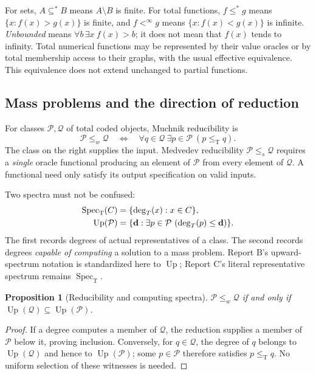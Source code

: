 \documentclass[11pt,a4paper]{article}
\newcommand{\leT}{\leq_{\mathrm T}}
\newcommand{\substar}{\subseteq^{*}}\newcommand{\lestar}{\leq^{*}}
\newcommand{\Spec}{\operatorname{Spec}_{\mathrm T}}\newcommand{\Up}{\operatorname{Up}}
\newtheorem{proposition}[theorem]{Proposition}
\theoremstyle{definition}\newtheorem{definition}[theorem]{Definition}
\theoremstyle{remark}\newtheorem{remark}[theorem]{Remark}
\begin{document}
For sets, $A\substar B$ means $A\setminus B$ is finite. For total functions, $f\lestar g$ means $\{x:f(x)>g(x)\}$ is finite, and $f<^\infty g$ means $\{x:f(x)<g(x)\}$ is infinite. \emph{Unbounded} means $\forall b\,\exists x\ f(x)>b$; it does not mean that $f(x)$ tends to infinity. Total numerical functions may be represented by their value oracles or by total membership access to their graphs, with the usual effective equivalence. This equivalence does not extend unchanged to partial functions.

\subsection{Mass problems and the direction of reduction}
For classes $\mathcal P,\mathcal Q$ of total coded objects, Muchnik reducibility is
\[
 \mathcal P\leq_w\mathcal Q
 \quad\Longleftrightarrow\quad
 \forall q\in\mathcal Q\ \exists p\in\mathcal P\ (p\leT q).
\]
The class on the right supplies the input. Medvedev reducibility $\mathcal P\leq_s\mathcal Q$ requires a \emph{single} oracle functional producing an element of $\mathcal P$ from every element of $\mathcal Q$. A functional need only satisfy its output specification on valid inputs.\cite{LMNS,McDonald}

Two spectra must not be confused:
\begin{align}
 \Spec(C)&=\{\deg_T(x):x\in C\},\notag\\
 \Up(\mathcal P)&=\{\mathbf d:\exists p\in\mathcal P\ (\deg_T(p)\leq\mathbf d)\}.
 \label{eq:spectrum}
\end{align}
The first records degrees of actual representatives of a class. The second records degrees \emph{capable of computing} a solution to a mass problem. Report B's upward-spectrum notation is standardized here to $\Up$; Report C's literal representative spectrum remains $\Spec$.

\begin{proposition}[Reducibility and computing spectra]
$\mathcal P\leq_w\mathcal Q$ if and only if $\Up(\mathcal Q)\subseteq\Up(\mathcal P)$.
\end{proposition}
\begin{proof}
If a degree computes a member of $\mathcal Q$, the reduction supplies a member of $\mathcal P$ below it, proving inclusion. Conversely, for $q\in\mathcal Q$, the degree of $q$ belongs to $\Up(\mathcal Q)$ and hence to $\Up(\mathcal P)$; some $p\in\mathcal P$ therefore satisfies $p\leT q$. No uniform selection of these witnesses is needed.
\end{proof}
\end{document}
